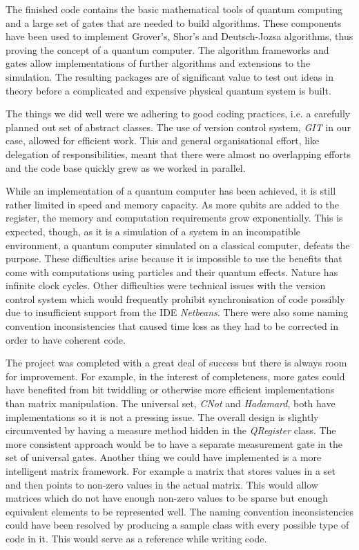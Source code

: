 The finished code contains the basic mathematical tools of quantum computing and a large set of gates that are needed to build algorithms. These components have been used to implement Grover's, Shor's and Deutsch-Jozsa algorithms, thus proving the concept of a quantum computer. The algorithm frameworks and gates allow implementations of further algorithms and extensions to the simulation. The resulting packages are of significant value to test out ideas in theory before a complicated and expensive physical quantum system is built.

The things we did well were we adhering to good coding practices, i.e. a carefully planned out set of abstract classes. The use of version control system, \emph{GIT} in our case, allowed for efficient work. This and general organisational effort, like delegation of responsibilities, meant that there were almost no overlapping efforts and the code base quickly grew as we worked in parallel.

While an implementation of a quantum computer has been achieved, it is still rather limited in speed and memory capacity. As more qubits are added to the register, the memory and computation requirements grow exponentially. This is expected, though, as it is a simulation of a system in an incompatible environment, a quantum computer simulated on a classical computer, defeats the purpose. These difficulties arise because it is impossible to use the benefits that come with computations using particles and their quantum effects. Nature has infinite clock cycles.
Other difficulties were technical issues with the version control system which would frequently prohibit synchronisation of code possibly due to insufficient support from the IDE \emph{Netbeans}. There were also some naming convention inconsistencies that caused time loss as they had to be corrected in order to have coherent code.

The project was completed with a great deal of success but there is always room for improvement. For example, in the interest of completeness, more gates could have benefited from bit twiddling or otherwise more efficient implementations than matrix manipulation. The universal set, \emph{CNot} and \emph{Hadamard}, both have implementations so it is not a pressing issue.
The overall design is slightly circumvented by having a measure method hidden in the \emph{QRegister} class. The more consistent approach would be to have a separate measurement gate in the set of universal gates.
Another thing we could have implemented is a more intelligent matrix framework. For example a matrix that stores values in a set and then points to non-zero values in the actual matrix. This would allow matrices which do not have enough non-zero values to be sparse but enough equivalent elements to be represented well.
The naming convention inconsistencies could have been resolved by producing a sample class with every possible type of code in it. This would serve as a reference while writing code.


